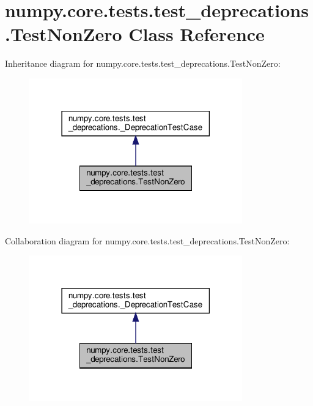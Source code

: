 \hypertarget{classnumpy_1_1core_1_1tests_1_1test__deprecations_1_1TestNonZero}{}\section{numpy.\+core.\+tests.\+test\+\_\+deprecations.\+Test\+Non\+Zero Class Reference}
\label{classnumpy_1_1core_1_1tests_1_1test__deprecations_1_1TestNonZero}


Inheritance diagram for numpy.\+core.\+tests.\+test\+\_\+deprecations.\+Test\+Non\+Zero\+:
\nopagebreak
\begin{figure}[H]
\begin{center}
\leavevmode
\includegraphics[width=261pt]{classnumpy_1_1core_1_1tests_1_1test__deprecations_1_1TestNonZero__inherit__graph}
\end{center}
\end{figure}


Collaboration diagram for numpy.\+core.\+tests.\+test\+\_\+deprecations.\+Test\+Non\+Zero\+:
\nopagebreak
\begin{figure}[H]
\begin{center}
\leavevmode
\includegraphics[width=261pt]{classnumpy_1_1core_1_1tests_1_1test__deprecations_1_1TestNonZero__coll__graph}
\end{center}
\end{figure}
